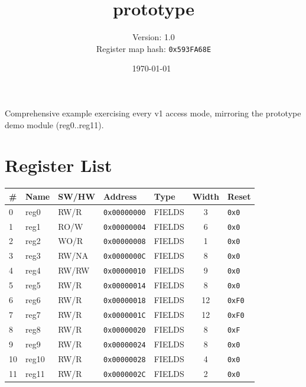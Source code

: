 \documentclass{article}
\title{prototype}
\author{Version: 1.0 \\ Register map hash: \texttt{0x593FA68E}}
\date{\today\ \currenttime}
\begin{document}
\maketitle
\thispagestyle{fancy}

Comprehensive example exercising every v1 access mode, mirroring the prototype demo module (reg0..reg11).

\section{Register List}

\begin{table}[h!]
  \begin{center}
    \label{tab:table1}
    \begin{tabularx}{\linewidth}{|l|X|l|l|l|c|l|}
      \hline
      \textbf{\#} & \textbf{Name} & \textbf{SW/HW} & \textbf{Address} & \textbf{Type} & \textbf{Width} &
      \textbf{Reset} \\
      \hline
      0 & reg0 & RW/R & \texttt{0x00000000} & FIELDS & 3 & \texttt{0x0} \\
      \hline
      1 & reg1 & RO/W & \texttt{0x00000004} & FIELDS & 6 & \texttt{0x0} \\
      \hline
      2 & reg2 & WO/R & \texttt{0x00000008} & FIELDS & 1 & \texttt{0x0} \\
      \hline
      3 & reg3 & RW/NA & \texttt{0x0000000C} & FIELDS & 8 & \texttt{0x0} \\
      \hline
      4 & reg4 & RW/RW & \texttt{0x00000010} & FIELDS & 9 & \texttt{0x0} \\
      \hline
      5 & reg5 & RW/R & \texttt{0x00000014} & FIELDS & 8 & \texttt{0x0} \\
      \hline
      6 & reg6 & RW/R & \texttt{0x00000018} & FIELDS & 12 & \texttt{0xF0} \\
      \hline
      7 & reg7 & RW/R & \texttt{0x0000001C} & FIELDS & 12 & \texttt{0xF0} \\
      \hline
      8 & reg8 & RW/R & \texttt{0x00000020} & FIELDS & 8 & \texttt{0xF} \\
      \hline
      9 & reg9 & RW/R & \texttt{0x00000024} & FIELDS & 8 & \texttt{0x0} \\
      \hline
      10 & reg10 & RW/R & \texttt{0x00000028} & FIELDS & 4 & \texttt{0x0} \\
      \hline
      11 & reg11 & RW/R & \texttt{0x0000002C} & FIELDS & 2 & \texttt{0x0} \\
      \hline
    \end{tabularx}
  \end{center}
\end{table}
\end{document}
